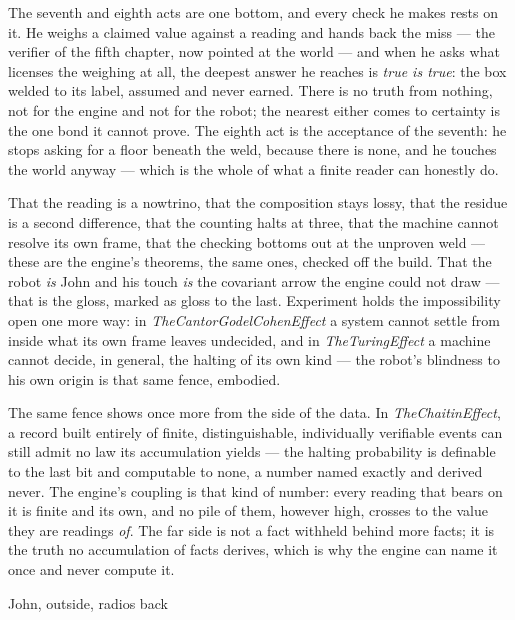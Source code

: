 The seventh and eighth acts are one bottom, and every check he makes rests on it.
He weighs a claimed value against a reading and hands back the miss --- the verifier of the fifth chapter, now pointed at
the world --- and when he asks what licenses the weighing at all, the deepest answer he reaches is \emph{true is true}:
the box welded to its label, assumed and never earned.
There is no truth from nothing, not for the engine and not for the robot; the nearest either comes to certainty is the
one bond it cannot prove.
The eighth act is the acceptance of the seventh: he stops asking for a floor beneath the weld, because there is none, and
he touches the world anyway --- which is the whole of what a finite reader can honestly do.

That the reading is a nowtrino, that the composition stays lossy, that the residue is a second difference, that the
counting halts at three, that the machine cannot resolve its own frame, that the checking bottoms out at the unproven
weld --- these are the engine's theorems, the same ones, checked off the build.
That the robot \emph{is} John and his touch \emph{is} the covariant arrow the engine could not draw --- that is the
gloss, marked as gloss to the last.
Experiment holds the impossibility open one more way: in \emph{TheCantorGodelCohenEffect} a system cannot settle from
inside what its own frame leaves undecided, and in \emph{TheTuringEffect} a machine cannot decide, in general, the
halting of its own kind --- the robot's blindness to his own origin is that same fence, embodied.

The same fence shows once more from the side of the data.
In \emph{TheChaitinEffect}, a record built entirely of finite, distinguishable, individually verifiable events can still
admit no law its accumulation yields --- the halting probability is definable to the last bit and computable to none, a
number named exactly and derived never.
The engine's coupling is that kind of number: every reading that bears on it is finite and its own, and no pile of them,
however high, crosses to the value they are readings \emph{of}.
The far side is not a fact withheld behind more facts; it is the truth no accumulation of facts derives, which is why the
engine can name it once and never compute it.

\begin{chorus}{John, outside, radios back}
\end{chorus}

